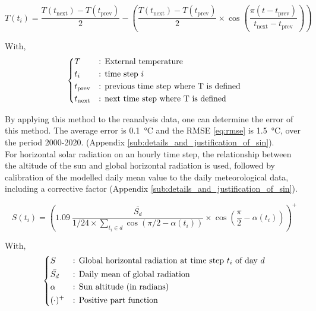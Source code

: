 \documentclass[11pt]{article}
\begin{document}
        \begin{equation}\label{eq:sin14r1}
             T(t_i) = \frac{T(t_\mathrm{next})-T(t_\mathrm{prev})}{2} - \left(\frac{T(t_\mathrm{next})-T(t_\mathrm{prev})}{2} \times \cos\left(\frac{\pi\left(t-t_\mathrm{prev}\right)}{t_\mathrm{next}-t_\mathrm{prev}}\right)\right)
        \end{equation} 

        \noindent
        With,
        $$
        \begin{dcases}
            T&\text{: External temperature}\\
            t_i&\text{: time step $i$}\\
            t_\mathrm{prev}&\text{: previous time step where T is defined}\\
            t_\mathrm{next}&\text{: next time step where T is defined}\\
        \end{dcases}
        $$

        By applying this method to the reanalysis data, one can determine the error of this method. The average error is \SI{0.1}{\celsius} and the RMSE \eqref{eq:rmse} is \SI{1.5}{\celsius}, over the period 2000-2020. (Appendix \ref{sub:details_and_justification_of_sin}). \\

        For horizontal solar radiation on an hourly time step, the relationship between the altitude of the sun and global horizontal radiation is used, followed by calibration of the modelled daily mean value to the daily meteorological data, including a corrective factor (Appendix \ref{sub:details_and_justification_of_sin}).

        \begin{equation}\label{eq:solar_eq}
             S(t_i) = \left(1.09~\frac{\bar{S_d}}{1/24\times\sum_{t_i \in d} \cos\left(\pi/2-\alpha(t_i)\right)} \times \cos\left(\frac{\pi}{2}-\alpha(t_i)\right)\right)^+
        \end{equation} 

        \noindent
        With,
        $$
        \begin{dcases}
            S&\text{: Global horizontal radiation at time step $t_i$ of day $d$}\\
            \bar{S_d}&\text{: Daily mean of global radiation}\\
            \alpha&\text{: Sun altitude (in radians)}\\
            (\cdot)^+&\text{: Positive part function}\\
        \end{dcases}
        $$
\end{document}
